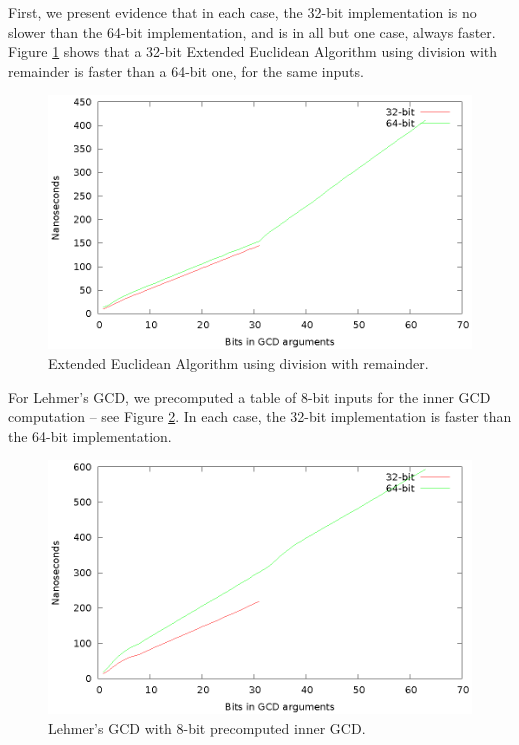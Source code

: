 \documentclass{ucalgthes1}
\theoremstyle{definition}
\begin{document}
First, we present evidence that in each case, the 32-bit implementation is no slower than the 64-bit implementation, and is in all but one case, always faster.  Figure \ref{fig:divrem-32v64} shows that a 32-bit Extended Euclidean Algorithm using division with remainder is faster than a 64-bit one, for the same inputs.
\begin{figure}[H]
\centering
\includegraphics{divrem-32v64}
\caption{Extended Euclidean Algorithm using division with remainder.}
\label{fig:divrem-32v64}
\end{figure}

For Lehmer's GCD, we precomputed a table of 8-bit inputs for the inner GCD computation -- see Figure \ref{fig:lehmer-32v64}. In each case, the 32-bit implementation is faster than the 64-bit implementation.
\begin{figure}[H]
\centering
\includegraphics{lehmer-32v64}
\caption{Lehmer's GCD with 8-bit precomputed inner GCD.}
\label{fig:lehmer-32v64}
\end{figure}
\end{document}
